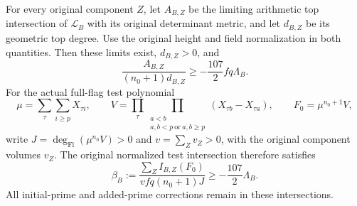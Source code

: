 \begin{theorem}
\label{thm:actual-signed-base-intersection}
For every original component $Z$, let $A_{B,Z}$ be the limiting
arithmetic top intersection of $\mathcal L_B$ with its original
determinant metric, and let $d_{B,Z}$ be its geometric top degree.
Use the original height and field normalization in both quantities.
Then these limits exist, $d_{B,Z}>0$, and
\[
 \frac{A_{B,Z}}{(n_0+1)d_{B,Z}}
                \ge-\frac{107}{2}fq\Lambda_B.
 \tag{HA15}
\]
For the actual full-flag test polynomial
\[
 \mu=\sum_{\tau}\sum_{i\ge p}X_{\tau i},\qquad
 V=\prod_\tau\prod_{\substack{a<b\\a,b<p\ \mathrm{or}\ a,b\ge p}}
                              (X_{\tau b}-X_{\tau a}),
 \qquad F_0=\mu^{n_0+1}V,
\]
write $J=\deg_{\mathrm{Fl}}(\mu^{n_0}V)>0$ and
$v=\sum_Zv_Z>0$, with the original component volumes $v_Z$.
The original normalized test intersection therefore satisfies
\[
 \beta_B:=\frac{\sum_Z I_{B,Z}(F_0)}{vfq(n_0+1)J}
                       \ge-\frac{107}{2}\Lambda_B.
 \tag{HA16}
\]
All initial-prime and added-prime corrections remain in these
intersections.
\end{theorem}

